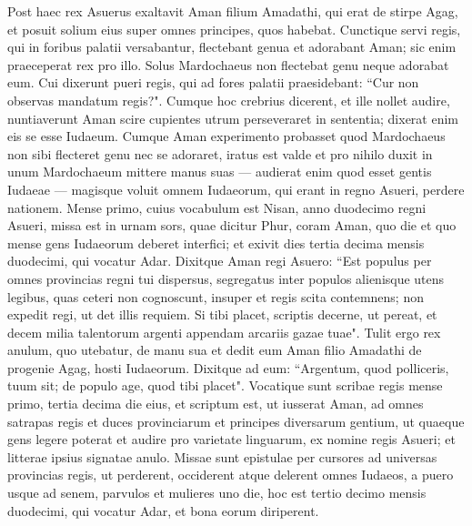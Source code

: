 \begin{biblechapter} 
\verse Post haec rex Asuerus exaltavit Aman filium Amadathi, qui erat de stirpe Agag, et posuit solium eius super omnes principes, quos habebat. 
\verse Cunctique servi regis, qui in foribus palatii versabantur, flectebant genua et adorabant Aman; sic enim praeceperat rex pro illo. Solus Mardochaeus non flectebat genu neque adorabat eum. 
\verse Cui dixerunt pueri regis, qui ad fores palatii praesidebant: “Cur non observas mandatum regis?". 
\verse Cumque hoc crebrius dicerent, et ille nollet audire, nuntiaverunt Aman scire cupientes utrum perseveraret in sententia; dixerat enim eis se esse Iudaeum. 
\verse Cumque Aman experimento probasset quod Mardochaeus non sibi flecteret genu nec se adoraret, iratus est valde 
\verse et pro nihilo duxit in unum Mardochaeum mittere manus suas — audierat enim quod esset gentis Iudaeae — magisque voluit omnem Iudaeorum, qui erant in regno Asueri, perdere nationem. 
\verse Mense primo, cuius vocabulum est Nisan, anno duodecimo regni Asueri, missa est in urnam sors, quae dicitur Phur, coram Aman, quo die et quo mense gens Iudaeorum deberet interfici; et exivit dies tertia decima mensis duodecimi, qui vocatur Adar. 
\verse Dixitque Aman regi Asuero: “Est populus per omnes provincias regni tui dispersus, segregatus inter populos alienisque utens legibus, quas ceteri non cognoscunt, insuper et regis scita contemnens; non expedit regi, ut det illis requiem. 
\verse Si tibi placet, scriptis decerne, ut pereat, et decem milia talentorum argenti appendam arcariis gazae tuae". 
\verse Tulit ergo rex anulum, quo utebatur, de manu sua et dedit eum Aman filio Amadathi de progenie Agag, hosti Iudaeorum. 
\verse Dixitque ad eum: “Argentum, quod polliceris, tuum sit; de populo age, quod tibi placet". 
\verse Vocatique sunt scribae regis mense primo, tertia decima die eius, et scriptum est, ut iusserat Aman, ad omnes satrapas regis et duces provinciarum et principes diversarum gentium, ut quaeque gens legere poterat et audire pro varietate linguarum, ex nomine regis Asueri; et litterae ipsius signatae anulo. 
\verse Missae sunt epistulae per cursores ad universas provincias regis, ut perderent, occiderent atque delerent omnes Iudaeos, a puero usque ad senem, parvulos et mulieres uno die, hoc est tertio decimo mensis duodecimi, qui vocatur Adar, et bona eorum diriperent. 

\end{biblechapter}
